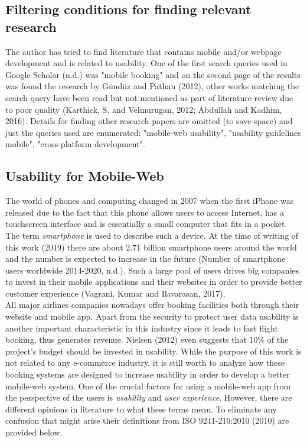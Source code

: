 \documentclass[version=last,fontsize=13pt]{scrartcl}
\begin{document}
\subsection{Filtering conditions for finding relevant research}
	The author has tried to find literature that contains  mobile and/or webpage development and is related to usability. One of the first search queries used in Google Scholar (n.d.) was "mobile booking" and on the second page of the results was found the research by Gündüz and Pathan (2012), other works matching the search query have been read but not mentioned as part of literature review due to poor quality (Karthick, S. and Velmurugan, 2012; Abdullah and Kadhim, 2016). Details for finding other research papers are omitted (to save space) and just the queries used are enumerated:  "mobile-web usability", "usability guidelines mobile", "cross-platform development".

\subsection{Usability for Mobile-Web}

\indent
	The world of phones and computing changed in 2007 when the first iPhone was released due to the fact that this phone allows users to access Internet, has a touchscreen interface and is essentially a small computer that fits in a pocket. The term \textit{smartphone} is used to describe such a device. At the time of writing of this work (2019) there are about 2.71 billion smartphone users around the world and the number is expected to increase in the future (Number of smartphone users worldwide 2014-2020, n.d.). Such a large pool of users drives big companies to invest in their mobile applications and their websites in order to provide better customer experience (Vagrani, Kumar and Ilavarasan, 2017).\\ 
	All major airlines companies nowadays offer booking facilities both through their website and mobile app. Apart from the security to protect user data usability is another important characteristic in this industry since it leads to fast flight booking, thus generates revenue. Nielsen (2012) even suggests that 10\% of  the project's budget should be invested in usability. While the purpose of this work is not related to any e-commerce industry, it is still worth to analyze how these booking systems are designed to increase usability in  order to develop a better mobile-web system. One of the crucial factors for using a mobile-web app from the perspective of the users is \textit{usability} and \textit{user experience}. However, there are different opinions in literature to what these terms mean. To eliminate any confusion that might arise their definitions from ISO 9241-210:2010 (2010) are provided below.
\end{document}
